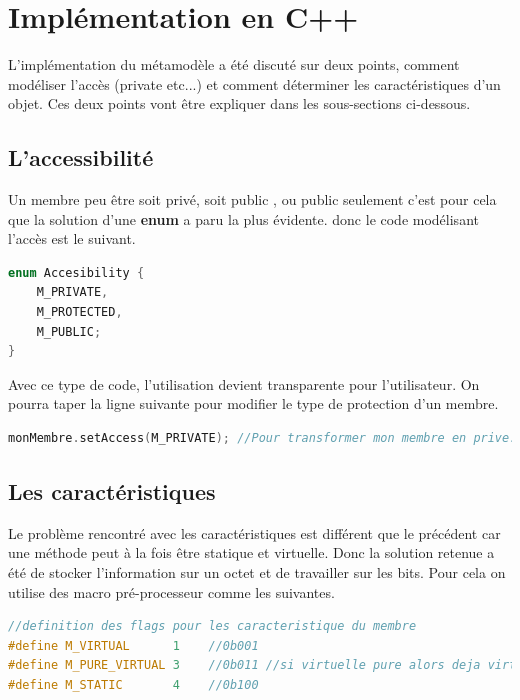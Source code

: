 \documentclass[a4paper,11pt]{report}
\begin{document}
\section{Implémentation en C++}

\normalsize{
L'implémentation du métamodèle a été discuté sur deux points, comment modéliser l'accès (private etc...) et comment déterminer les caractéristiques d'un objet. Ces deux points vont être expliquer dans les sous-sections ci-dessous.

\subsection{L'accessibilité}

\normalsize{
Un membre peu être soit privé, soit public , ou public seulement c'est pour cela que la solution d'une {\bf enum} a paru la plus évidente. donc le code modélisant l'accès est le suivant.
}

\begin{lstlisting}[language=C++]
enum Accesibility {
    M_PRIVATE,
    M_PROTECTED,
    M_PUBLIC;
}
\end{lstlisting}

\normalsize{
Avec ce type de code, l'utilisation devient transparente pour l'utilisateur. On pourra taper la ligne suivante pour modifier le type de protection d'un membre.
}

\begin{lstlisting}[language=C++]
monMembre.setAccess(M_PRIVATE); //Pour transformer mon membre en prive.
\end{lstlisting}


\subsection{Les caractéristiques}

\normalsize{
Le problème rencontré avec les caractéristiques est différent que le précédent car une méthode peut à la fois être statique et virtuelle. Donc la solution retenue a été de stocker l'information sur un octet et de travailler sur les bits. Pour cela on utilise des macro pré-processeur comme les suivantes.
}

\begin{lstlisting}[language=C++]
//definition des flags pour les caracteristique du membre
#define M_VIRTUAL      1    //0b001
#define M_PURE_VIRTUAL 3    //0b011 //si virtuelle pure alors deja virtuelle
#define M_STATIC       4    //0b100
\end{lstlisting}

}
\end{document}
